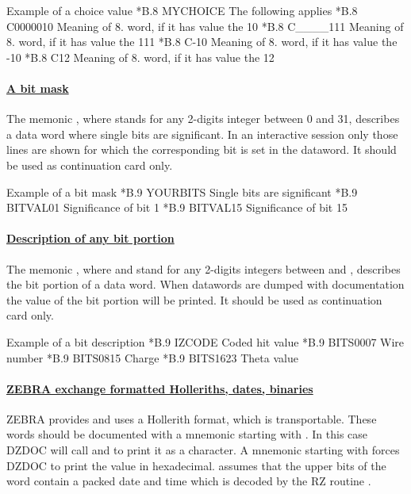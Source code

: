 \begin{XMPt}{Example of a choice value}
*B.8      MYCHOICE   The following applies
*B.8      C0000010   Meaning of 8. word, if it has value the 10
*B.8      C____111   Meaning of 8. word, if it has value the 111
*B.8      C-10       Meaning of 8. word, if it has value the -10
*B.8      C12        Meaning of 8. word, if it has value the 12
\end{XMPt}
 
\paragraph{\underline{\bf A bit mask}}
 
The memonic , where  stands for any 2-digits integer
between 0 and 31, describes a data word where single bits are significant. 
In an interactive session only those lines are shown
for which the corresponding bit is set in the dataword.
It should be used as continuation card only.
 
\begin{XMPt}{Example of a bit mask}
*B.9      YOURBITS  Single bits are significant
*B.9      BITVAL01  Significance of bit 1
*B.9      BITVAL15  Significance of bit 15
\end{XMPt}
 
\paragraph{\underline{\bf Description of any bit portion}}
 
The memonic , where  and  
stand for any 2-digits integers between  and , 
describes the bit portion of a data word.
When datawords are dumped with documentation the value
of the bit portion will be printed.
It should be used as continuation card only.
 
\begin{XMPt}{Example of a bit description}
*B.9      IZCODE     Coded hit value
*B.9      BITS0007   Wire number
*B.9      BITS0815   Charge
*B.9      BITS1623   Theta value
\end{XMPt}
 
\paragraph{\underline{\bf ZEBRA exchange formatted Holleriths,
dates, binaries}}
ZEBRA provides and uses a Hollerith format, which is transportable.
These words should be documented with a mnemonic starting with
. In this case DZDOC will call  and  to print
it as a character. A mnemonic starting with  forces DZDOC
to print the value in hexadecimal.  assumes that the upper
bits of the word contain a packed date and time which is decoded
by the RZ routine .
 
